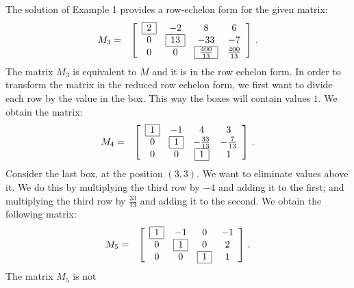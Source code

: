The solution of Example 1 provides a row-echelon form for the given matrix: \begin{eqnarray*} M_3&=&\left[\begin{array}{cccc}\begin{array}{|c|}\hline 2\\\hline\end{array}&-2&8&6\\ 0&\begin{array}{|c|}\hline 13\\\hline\end{array}&-33&-7\\ 0&0&\begin{array}{|c|}\hline \frac{400}{13}\\\hline\end{array}&\frac{400}{13}\end{array}\right]\,. \end{eqnarray*} The matrix \( M_3 \) is equivalent to \( M \) and it is in the row echelon form. In order to transform the matrix in the reduced row echelon form, we first want to divide each row by the value in the box. This way the boxes will contain values \( 1 \). We obtain the matrix: \begin{eqnarray*}M_4&=&\left[\begin{array}{cccc}\begin{array}{|c|}\hline 1\\\hline\end{array}&-1&4&3\\ 0&\begin{array}{|c|}\hline 1\\\hline\end{array}&-\frac{33}{13}&-\frac{7}{13}\\ 0&0&\begin{array}{|c|}\hline 1\\\hline\end{array}&1\end{array}\right]\,. \end{eqnarray*} Consider the last box, at the position \( (3,3) \). We want to eliminate values above it. We do this by multiplying the third row by \( -4 \) and adding it to the first; and multiplying the third row by \( \frac{33}{13} \) and adding it to the second. We obtain the following matrix: \begin{eqnarray*}M_5&=&\left[\begin{array}{cccc}\begin{array}{|c|}\hline 1\\\hline\end{array}&-1&0&-1\\ 0&\begin{array}{|c|}\hline 1\\\hline\end{array}&0&2\\ 0&0&\begin{array}{|c|}\hline 1\\\hline\end{array}&1\end{array}\right]\,. \end{eqnarray*} The matrix \( M_5 \) is not 